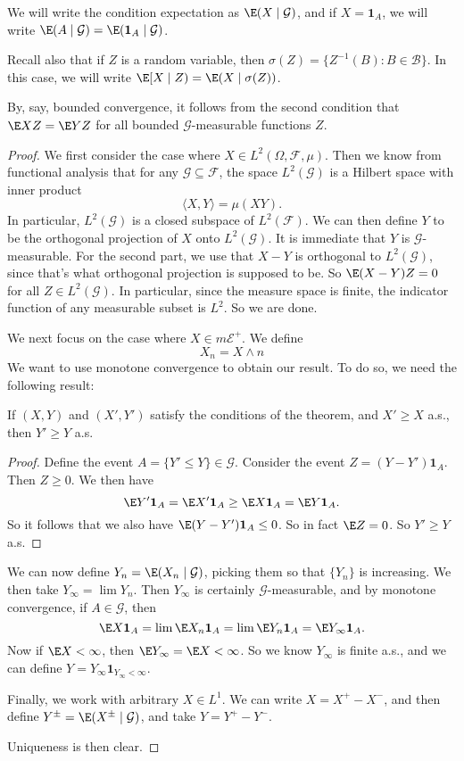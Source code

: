 \documentclass[a4paper]{article}
\begin{document}
We will write the condition expectation as $\E(X \mid \mathcal{G})$, and if $X = \mathbf{1}_A$, we will write $\E(A \mid \mathcal{G}) = \E(\mathbf{1}_A \mid \mathcal{G})$.

Recall also that if $Z$ is a random variable, then $\sigma(Z) = \{Z^{-1}(B): B \in \mathcal{B}\}$. In this case, we will write $\E[X \mid Z) = \E(X \mid \sigma(Z))$.

By, say, bounded convergence, it follows from the second condition that $\E XZ = \E YZ$ for all bounded $\mathcal{G}$-measurable functions $Z$.
\begin{proof}
  We first consider the case where $X \in L^2(\Omega, \mathcal{F}, \mu)$. Then we know from functional analysis that for any $\mathcal{G} \subseteq \mathcal{F}$, the space $L^2(\mathcal{G})$ is a Hilbert space with inner product
  \[
    \langle X, Y \rangle = \mu (X Y).
  \]
  In particular, $L^2(\mathcal{G})$ is a closed subspace of $L^2(\mathcal{F})$. We can then define $Y$ to be the orthogonal projection of $X$ onto $L^2(\mathcal{G})$. It is immediate that $Y$ is $\mathcal{G}$-measurable. For the second part, we use that $X - Y$ is orthogonal to $L^2(\mathcal{G})$, since that's what orthogonal projection is supposed to be. So $\E(X - Y)Z = 0$ for all $Z \in L^2(\mathcal{G})$. In particular, since the measure space is finite, the indicator function of any measurable subset is $L^2$. So we are done.

  We next focus on the case where $X \in m\mathcal{E}^+$. We define
  \[
    X_n = X \wedge n
  \]
  We want to use monotone convergence to obtain our result. To do so, we need the following result:

  \begin{claim}
    If $(X, Y)$ and $(X', Y')$ satisfy the conditions of the theorem, and $X' \geq X$ a.s., then $Y' \geq Y$ a.s.
  \end{claim}

  \begin{proof}
    Define the event $A = \{Y' \leq Y\} \in \mathcal{G}$. Consider the event $Z = (Y - Y')\mathbf{1}_A$. Then $Z \geq 0$. We then have
    \[
      \E Y' \mathbf{1}_A = \E X' \mathbf{1}_A \geq \E X \mathbf{1}_A = \E Y \mathbf{1}_A.
    \]
    So it follows that we also have $\E(Y - Y')\mathbf{1}_A \leq 0$. So in fact $\E Z = 0$. So $Y' \geq Y$ a.s.
  \end{proof}
  We can now define $Y_n = \E(X_n \mid \mathcal{G})$, picking them so that $\{Y_n\}$ is increasing. We then take $Y_\infty = \lim Y_n$. Then $Y_\infty$ is certainly $\mathcal{G}$-measurable, and by monotone convergence, if $A \in \mathcal{G}$, then
  \[
    \E X \mathbf{1}_A = \lim \E X_n \mathbf{1}_A = \lim \E Y_n \mathbf{1}_A = \E Y_\infty \mathbf{1}_A.
  \]
  Now if $\E X < \infty$, then $\E Y_\infty = \E X < \infty$. So we know $Y_\infty$ is finite a.s., and we can define $Y = Y_\infty \mathbf{1}_{Y_\infty < \infty}$.

  Finally, we work with arbitrary $X \in L^1$. We can write $X = X^+ - X^-$, and then define $Y^\pm = \E (X^\pm \mid \mathcal{G})$, and take $Y = Y^+ - Y^-$.

  Uniqueness is then clear.
\end{proof}
\end{document}
